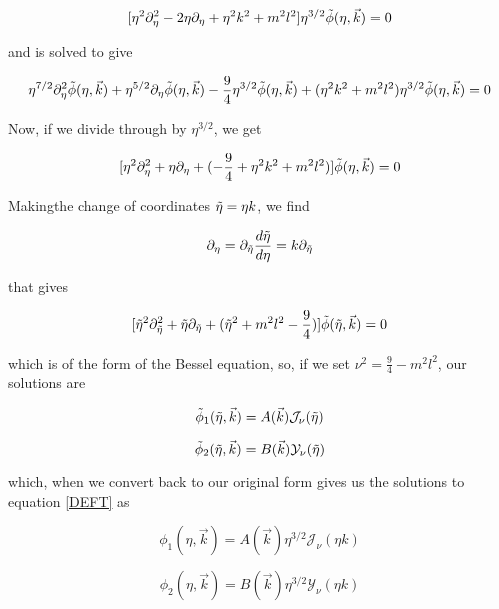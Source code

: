 \documentclass[a4paper,11pt]{article}
\numberwithin{equation}{section}
\numberwithin{figure}{section}
\begin{document}
\begin{large}
$$[\eta^2\partial_\eta^2-2\eta\partial_\eta+\eta^2k^2+m^2l^2]\eta^{3/2}\Tilde{\phi}(\eta,\Vec{k})=0$$

and is solved to give

$$\eta^{7/2}\partial_\eta^2\Tilde{\phi}(\eta,\Vec{k})+\eta^{5/2}\partial_\eta\Tilde{\phi}(\eta,\Vec{k})-\frac{9}{4}\eta^{3/2}\Tilde{\phi}(\eta,\Vec{k})+(\eta^2k^2+m^2l^2)\eta^{3/2}\Tilde{\phi}(\eta,\Vec{k})=0$$

Now, if we divide through by $\eta^{3/2}$, we get

$$[\eta^2\partial_\eta^2+\eta\partial_\eta+(-\frac{9}{4}+\eta^2k^2+m^2l^2)]\Tilde{\phi}(\eta,\Vec{k})=0$$

Makingthe change of coordinates $\Tilde{\eta}=\eta k$, we find 

$$\partial_\eta=\partial_{\Tilde{\eta}}\frac{d\Tilde{\eta}}{d\eta}=k\partial_{\Tilde{\eta}}$$

that gives

$$[{\Tilde{\eta}}^2\partial_{\Tilde{\eta}}^2+{\Tilde{\eta}}\partial_{\Tilde{\eta}}+(\Tilde{\eta}^2+m^2l^2-\frac{9}{4})]\Tilde{\phi}(\Tilde{\eta},\Vec{k})=0$$

which is of the form of the Bessel equation, so, if we set $\nu^2=\frac{9}{4}-m^2l^2$, our solutions are

$$\Tilde{\phi}_1(\Tilde{\eta},\Vec{k})=A(\Vec{k})\mathcal{J}_\nu (\Tilde{\eta})$$

$$\Tilde{\phi}_2(\Tilde{\eta},\Vec{k})=B(\Vec{k})\mathcal{Y}_\nu (\Tilde{\eta})$$

which, when we convert back to our original form gives us the solutions to equation \eqref{DEFT} as

$$\phi_1(\eta,\Vec{k})=A(\Vec{k})\eta^{3/2}\mathcal{J}_\nu (\eta k)$$

$$\phi_2(\eta,\Vec{k})=B(\Vec{k})\eta^{3/2}\mathcal{Y}_\nu (\eta k)$$



\newpage







\end{large}
\end{document}
